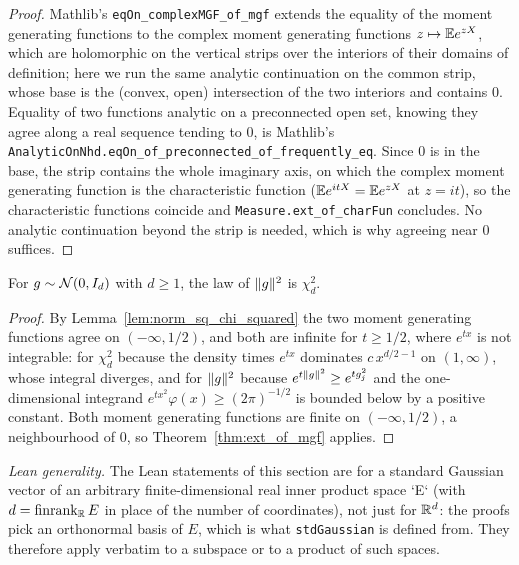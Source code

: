 \begin{proof}
\leanok
Mathlib's \texttt{eqOn\_complexMGF\_of\_mgf} extends the equality of the moment generating
functions to the complex moment generating functions $z \mapsto \mathbb{E} e^{zX}$, which are holomorphic
on the vertical strips over the interiors of their domains of definition; here we run the same
analytic continuation on the common strip, whose base is the (convex, open) intersection of the
two interiors and contains $0$. Equality of two functions analytic on a preconnected open set,
knowing they agree along a real sequence tending to $0$, is Mathlib's
\texttt{AnalyticOnNhd.eqOn\_of\_preconnected\_of\_frequently\_eq}. Since $0$ is in the base, the
strip contains the whole imaginary axis, on which the complex moment generating function is the
characteristic function ($\mathbb{E} e^{itX} = \mathbb{E} e^{zX}$ at $z = it$), so the characteristic functions
coincide and \texttt{Measure.ext\_of\_charFun} concludes. No analytic continuation beyond the
strip is needed, which is why agreeing near $0$ suffices.
\end{proof}

\begin{corollary}
\label{cor:norm_sq_chi_squared_law}
\leanok
{}
For $g \sim \mathcal{N}(0,I_d)$ with $d \ge 1$, the law of $\lVert g \rVert^2$ is $\chi^2_d$.
\end{corollary}

\begin{proof}
\leanok
{}
By Lemma~\ref{lem:norm_sq_chi_squared} the two moment generating functions agree on
$(-\infty,1/2)$, and both are infinite for $t \ge 1/2$, where $e^{tx}$ is not integrable: for
$\chi^2_d$ because the density times $e^{tx}$ dominates $c\,x^{d/2-1}$ on $(1,\infty)$, whose
integral diverges, and for $\lVert g \rVert^2$ because $e^{t\lVert g \rVert^2} \ge e^{tg_j^2}$ and the
one-dimensional integrand $e^{tx^2}\varphi(x) \ge (2\pi)^{-1/2}$ is bounded below by a positive
constant. Both moment generating functions are finite on $(-\infty,1/2)$, a neighbourhood of $0$,
so Theorem~\ref{thm:ext_of_mgf} applies.
\end{proof}

\emph{Lean generality.} The Lean statements of this section are for a standard Gaussian vector of
an arbitrary finite-dimensional real inner product space `E` (with $d = \operatorname{finrank}_{\mathbb{R}} E$
in place of the number of coordinates), not just for $\mathbb{R}^d$: the proofs pick an orthonormal basis of
$E$, which is what \texttt{stdGaussian} is defined from. They therefore apply verbatim to a subspace
or to a product of such spaces.

